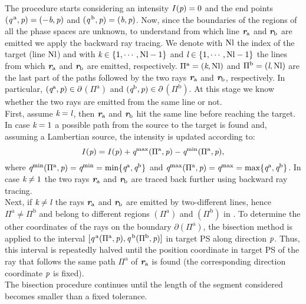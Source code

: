 The procedure starts considering an intensity $I(\textit{p})=0$ and the end points $(\textit{q}^{\,\textrm{a}}, \textit{p})= (-\textit{b}, \textit{p})$ and $(\textit{q}^{\,\textrm{b}}, \textit{p}) = (\textit{b}, \textit{p})$. Now, since the boundaries of the regions of all the phase spaces are unknown, to understand from which line $\textit{\textbf{r}}_{\textrm{a}}$ and $\textit{\textbf{r}}_{\textrm{b}}$ are emitted we apply the backward ray tracing. We denote with $\textrm{Nl}$ the index of the target (line $\textrm{Nl}$) and with $\textit{k}\in\{1,\cdots, \textrm{Nl}-1\}$ and $\textit{l}\in\{1,\cdots, \textrm{Nl}-1\}$ the lines from which $\textit{\textbf{r}}_{\textrm{a}}$ and $\textit{\textbf{r}}_{\textrm{b}}$ are emitted, respectively. $\Pi^\textrm{a} = (\textit{k}, \textrm{Nl})$ and $\Pi^\textrm{b} = (\textit{l},\textrm{Nl})$ are the last part of the paths followed by the two rays $\textit{\textbf{r}}_{\textrm{a}}$ and $\textit{\textbf{r}}_{\textrm{b}}$, respectively. In particular, $(\textit{q}^{\textrm{a}}, \textit{p})\in\partial$$(\Pi^{\textrm{a}})$ and $(\textit{q}^{\textrm{b}}, \textit{p})\in\partial$$(\Pi^{\textrm{b}})$. At this stage we know whether the two rays are emitted from the same line or not. \\ \indent 
First, assume $\textit{k}= \textit{l}$, then $\textit{\textbf{r}}_{\textrm{a}}$ and $\textit{\textbf{r}}_{\textrm{b}}$ hit the same line before reaching the target. 
In case $\textit{k} = 1$ a possible path from the source to the target is found and, assuming a Lambertian source, the intensity is updated according to:
\begin{equation}
I(\textit{p}) = I(\textit{p})+\textit{q}^{\textrm{max}}(\Pi^\textrm{a}, \textit{p})-\textit{q}^{\textrm{min}}(\Pi^\textrm{a}, \textit{p}),
\end{equation}
where $\textit{q}^{\textrm{min}}(\Pi^\textrm{a}, \textit{p}) = \textit{q}^{\textrm{min}} = \min\{\textit{q}^{\textrm{a}}, \textit{q}^{\textrm{b}}\}$ and $\textit{q}^{\textrm{max}}(\Pi^\textrm{a}, \textit{p}) = \textit{q}^{\textrm{max}} = \max\{\textit{q}^{\textrm{a}}, \textit{q}^{\textrm{b}}\}$. In case $\textit{k}\neq1$ the two rays $\textit{\textbf{r}}_{\textrm{a}}$ and $\textit{\textbf{r}}_{\textrm{b}}$ are traced back further using backward ray tracing.
\\ \indent Next, if $\textit{k}\neq \textit{l}$ the rays $\textit{\textbf{r}}_\textrm{a}$ and $\textit{\textbf{r}}_\textrm{b}$ are emitted by two-different lines, hence $\Pi^{\textrm{a}}\neq \Pi^{\textrm{b}}$ and belong to different regions $(\Pi^{\textrm{a}})$ and $(\Pi^{\textrm{b}})$ in . To determine the other coordinates of the rays on the boundary $\partial$$(\Pi^{\textrm{a}})$, the bisection method is applied to the interval $[\textit{q}^{\,\textrm{a}}(\Pi^{\textrm{a}}, \textit{p}), \textit{q}^{\,\textrm{b}}(\Pi^{\textrm{b}}, \textit{p})]$ in target PS  along direction $\textit{p}$. Thus, this interval is repeatedly halved until the position coordinate in target PS of the ray that follows the same path $\Pi^{\textrm{a}}$ of $\textit{\textbf{r}}_{\textrm{a}}$ is found (the corresponding direction coordinate $\textit{p}$ is fixed). \\ \indent The bisection procedure continues until the length of the segment considered becomes smaller than a fixed tolerance. 
